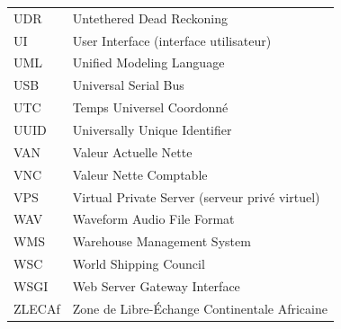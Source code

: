 \begin{longtable}{@{}p{3.2cm}p{11.4cm}@{}}
	UDR & Untethered Dead Reckoning \\
	UI & User Interface (interface utilisateur) \\
	UML & Unified Modeling Language \\
	USB & Universal Serial Bus \\
	UTC & Temps Universel Coordonné \\
	UUID & Universally Unique Identifier \\
	VAN & Valeur Actuelle Nette \\
	VNC & Valeur Nette Comptable \\
	VPS & Virtual Private Server (serveur privé virtuel) \\
	WAV & Waveform Audio File Format \\
	WMS & Warehouse Management System \\
	WSC & World Shipping Council \\
	WSGI & Web Server Gateway Interface \\
	ZLECAf & Zone de Libre-Échange Continentale Africaine \\
	
\end{longtable}
\tablesourcepromoteurs

